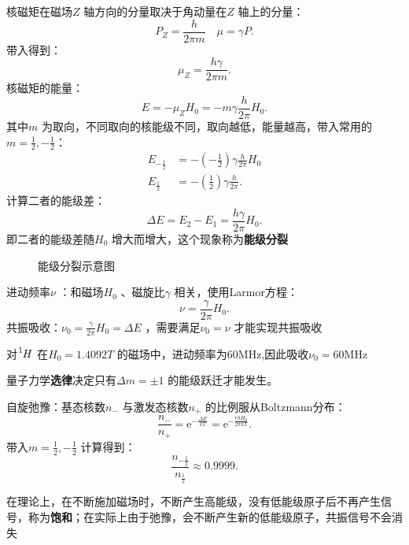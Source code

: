 \begin{notation}
    核磁矩在磁场$Z$ 轴方向的分量取决于角动量在$Z$ 轴上的分量：\[
        P_Z = \frac{h}{2\pi m}\quad \mu = \gamma P
    .\]
    带入得到：\[
        \mu_Z = \frac{h\gamma}{2\pi m}
    .\]
    核磁矩的能量：\[
        E = -\mu_Z H_0 = -m\gamma \frac{h}{2\pi }H_0
    .\]
    其中$m$ 为取向，不同取向的核能级不同，取向越低，能量越高，带入常用的$m = \frac{1}{2}, -\frac{1}{2}$：
    \begin{align*}
        E_{-\frac{1}{2}} &= -\left( -\frac{1}{2} \right)\gamma \frac{h}{2\pi }H_0\\
    E_{\frac{1}{2}} &= -\left( \frac{1}{2} \right)\gamma \frac{h}{2\pi }
    .\end{align*}
    计算二者的能级差：\[
        \Delta E = E_2-E_1 = \frac{h\gamma}{2\pi}H_0
    .\]
    即二者的能级差随$H_0$ 增大而增大，这个现象称为\textbf{能级分裂}
\begin{figure}[ht!]
    \centering
    \caption{能级分裂示意图}
    \label{fig:能级分裂示意图}
\end{figure}
\end{notation}
\begin{notation}
    进动频率$\nu$ ：和磁场$H_0$ 、磁旋比$\gamma$ 相关，使用Larmor方程：
    \[
        \nu = \frac{\gamma}{2\pi } H_0
    .\]
    共振吸收：$\nu_0 = \frac{\gamma}{2\pi }H_0=\Delta E$ ，需要满足$\nu_0=\nu$ 才能实现共振吸收
    \begin{eg}
        对$\ce{^{1}}H$ 在$H_0=1.4092T$ 的磁场中，进动频率为60MHz,因此吸收$\nu_0=60\text{MHz}$
    \end{eg}
\end{notation}
\begin{notation}
    量子力学\textbf{选律}决定只有$\Delta m = \pm 1$ 的能级跃迁才能发生。
\end{notation}
\begin{notation}
    自旋弛豫：基态核数$n_{-}$ 与激发态核数$n_{+}$ 的比例服从Boltzmann分布：\[
    \frac{n_{-}}{n_{+}} = \mathrm{e}^{-\frac{\Delta E}{kT}} = \mathrm{e}^{-\frac{rhH_0}{2\pi kT}}
    .\]
    带入$m = \frac{1}{2}, -\frac{1}{2}$ 计算得到：\[
        \frac{n_{-\frac{1}{2}}}{n_{\frac{1}{2}}} \approx 0.9999
    .\]
\end{notation}
\begin{notation}
    在理论上，在不断施加磁场时，不断产生高能级，没有低能级原子后不再产生信号，称为\textbf{饱和}；在实际上由于弛豫，会不断产生新的低能级原子，共振信号不会消失
\end{notation}
